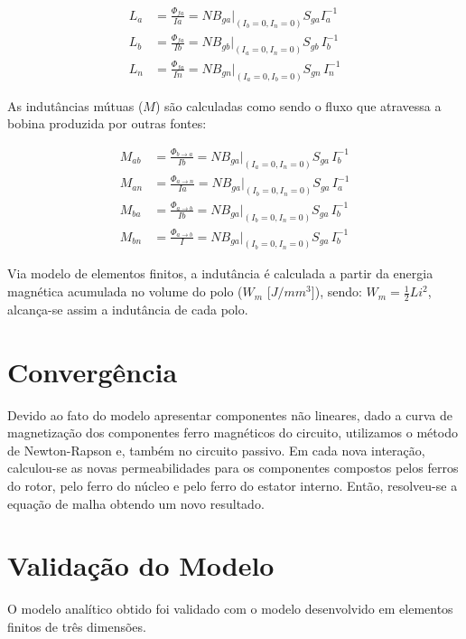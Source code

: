 \begin{align}
	L_{a} &= \frac{\Phi_{fa}}{Ia} = N B_{ga}\biggr\rvert_{(I_b = 0, I_n = 0)} S_{ga}  I_a^{-1} \\
	L_{b} &= \frac{\Phi_{fa}}{Ib} = N B_{gb}\biggr\rvert_{(I_a = 0, I_n = 0)} S_{gb} \, I_b^{-1} \\
	L_{n} &= \frac{\Phi_{fa}}{In} = N B_{gn}\biggr\rvert_{(I_a = 0, I_b = 0)} S_{gn} \, I_n^{-1}
\end{align}

As indutâncias mútuas ($M$) são calculadas como sendo o fluxo que atravessa a bobina produzida por outras fontes: 

\begin{align}
M_{ab} &= \frac{\Phi_{b \rightarrow a}}{Ib} = N B_{ga}\biggr\rvert_{(I_a = 0, I_n = 0)} S_{ga} \, I_b^{-1} \\
M_{an} &= \frac{\Phi_{a \rightarrow n}}{Ia} = N B_{ga}\biggr\rvert_{(I_b = 0, I_n = 0)} S_{ga} \, I_a^{-1} \\
M_{ba} &= \frac{\Phi_{a \rightarrow b}}{Ib} = N B_{ga}\biggr\rvert_{(I_b = 0, I_n = 0)} S_{ga} \, I_b^{-1} \\
M_{bn} &= \frac{\Phi_{a \rightarrow b}}{I} = N B_{ga}\biggr\rvert_{(I_b = 0, I_n = 0)} S_{ga} \, I_b^{-1} 
\end{align}

Via modelo de elementos finitos, a indutância é calculada a partir da energia magnética acumulada no volume do polo ($W_m$ [$J/mm^3$]), sendo: $W_m = \frac{1}{2} L i^2$, alcança-se assim a indutância de cada polo.

\section{Convergência}

Devido ao fato do modelo apresentar componentes não lineares, dado a curva de magnetização dos componentes ferro magnéticos do circuito, utilizamos o método de Newton-Rapson e, também no circuito passivo. Em cada nova interação, calculou-se as novas permeabilidades para os componentes compostos pelos ferros do rotor, pelo ferro do núcleo e pelo ferro do estator interno. Então, resolveu-se a equação de malha obtendo um novo resultado.

\section{Validação do Modelo}

O modelo analítico obtido foi validado com o modelo desenvolvido em elementos finitos de três dimensões.

